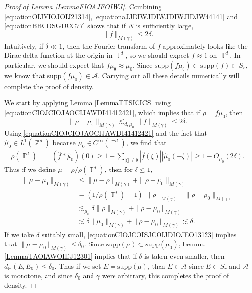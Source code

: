 \documentclass[dvipsnames,letterpaper,12pt]{article}
\numberwithin{equation}{section}
\DeclareMathOperator{\ZZ}{\mathbb{Z}}
\DeclareMathOperator{\TT}{\mathbb{T}}
\numberwithin{theorem}{section}
\begin{document}
\begin{proof}[Proof of Lemma \ref{LemmaFIOAJFOIWJ}]
    Combining \eqref{equationOIJVIOJOIJ21314}, \eqref{equationaJJDIWJDIWJDIWJIDJW44141} and \eqref{equationBBCDSGDCC77} shows that if $N$ is sufficiently large,
    \begin{equation} \label{equationCIOJCIOJAOCIJAWDI41412421}
        \| f \|_{M(\gamma)} \leq 2 \delta.
    \end{equation}
    Intuitively, if $\delta \ll 1$, then the Fourier transform of $f$ approximately looks like the Dirac delta function at the origin in $\TT^d$, so we should expect $f \approx 1$ on $\TT^d$. In particular, we should expect that $f \mu_0 \approx \mu_0$. Since $\text{supp}(f \mu_0) \subset \text{supp}(f) \subset S_r$, we know that $\text{supp}(f \mu_0) \in \mathcal{A}$. Carrying out all these details numerically will complete the proof of density.

    We start by applying Lemma \ref{LemmaTTSICICS} using \eqref{equationCIOJCIOJAOCIJAWDI41412421}, which implies that if $\rho = f \mu_0$, then
    \begin{equation}
        \| \rho - \mu_0 \|_{M(\gamma)} \lesssim_{d,\mu_0} \| f \|_{M(\gamma)} \leq 2 \delta.
    \end{equation}
    Using \eqref{equationCIOJCIOJAOCIJAWDI41412421} and the fact that $\widehat{\mu}_0 \in L^1(\ZZ^d)$ because $\mu_0 \in C^\infty(\TT^d)$, we find that
    \begin{equation} \label{equationFIOJCIOWJCOIJFIO}
    \begin{split}
        \rho(\TT^d) &= (\widehat{f} * \widehat{\mu}_0)(0) \geq 1 - \sum_{|\xi| \neq 0} |\widehat{f}(\xi)| |\widehat{\mu}_0(-\xi)| \geq 1 - O_{\mu_0}(2 \delta).
    \end{split}
    \end{equation}
    Thus if we define $\mu = \rho / \rho(\TT^d)$, then for $\delta \leq 1$,
    \begin{equation} \label{equationCIOJCOISJCOIJDIOJEO13123}
    \begin{split}
        \| \mu - \mu_0 \|_{M(\gamma)} &\leq \| \mu - \rho \|_{M(\gamma)} + \| \rho - \mu_0 \|_{M(\gamma)}\\
        &= (1 / \rho(\TT^d) - 1) \cdot \| \rho \|_{M(\gamma)} + \| \rho - \mu_0 \|_{M(\gamma)}\\
        &\lesssim_{\mu_0} \delta \| \rho \|_{M(\gamma)} + \| \rho - \mu_0 \|_{M(\gamma)}\\
        &\lesssim \delta \| \mu_0 \|_{M(\gamma)} + \| \rho - \mu_0 \|_{M(\gamma)} \lesssim \delta.
    \end{split}
    \end{equation}
    If we take $\delta$ suitably small, \eqref{equationCIOJCOISJCOIJDIOJEO13123} implies that $\| \mu - \mu_0 \|_{M(\gamma)} \leq \delta_0$. Since $\text{supp}(\mu) \subset \text{supp}(\mu_0)$, Lemma \ref{LemmaTAOIAWOIDJ12301} implies that if $\delta$ is taken even smaller, then $d_{\mathbb{H}}(E, E_0) \leq \delta_0$. Thus if we set $E = \text{supp}(\mu)$, then $E \in \mathcal{A}$ since $E \subset S_r$ and $\mathcal{A}$ is monotone, and since $\delta_0$ and $\gamma$ were arbitrary, this completes the proof of density.
\end{proof}
\end{document}
